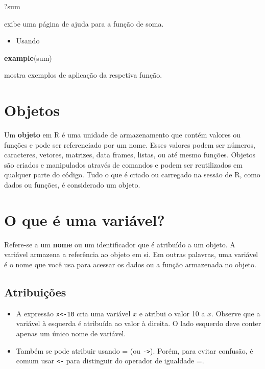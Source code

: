 \documentclass[
]{book}
\newenvironment{Shaded}{\begin{snugshade}}{\end{snugshade}}
\newcommand{\FunctionTok}[1]{\textcolor[rgb]{0.13,0.29,0.53}{\textbf{#1}}}
\newcommand{\NormalTok}[1]{#1}
\providecommand{\tightlist}{%
  \setlength{\itemsep}{0pt}\setlength{\parskip}{0pt}}
\begin{document}
\begin{Shaded}
\begin{Highlighting}[]
\NormalTok{?sum}
\end{Highlighting}
\end{Shaded}

exibe uma página de ajuda para a função de soma.

\begin{itemize}
\tightlist
\item
  Usando
\end{itemize}

\begin{Shaded}
\begin{Highlighting}[]
\FunctionTok{example}\NormalTok{(sum)}
\end{Highlighting}
\end{Shaded}

mostra exemplos de aplicação da respetiva função.

\section{Objetos}\label{objetos}

Um \textbf{objeto} em R é uma unidade de armazenamento que contém valores ou funções e pode ser referenciado por um nome. Esses valores podem ser números, caracteres, vetores, matrizes, data frames, listas, ou até mesmo funções. Objetos são criados e manipulados através de comandos e podem ser reutilizados em qualquer parte do código. Tudo o que é criado ou carregado na sessão de R, como dados ou funções, é considerado um objeto.

\section{O que é uma variável?}\label{o-que-uxe9-uma-variuxe1vel}

Refere-se a um \textbf{nome} ou um identificador que é atribuído a um objeto. A variável armazena a referência ao objeto em si. Em outras palavras, uma variável é o nome que você usa para acessar os dados ou a função armazenada no objeto.

\subsection{Atribuições}\label{atribuiuxe7uxf5es}

\begin{itemize}
\item
  A expressão \texttt{x\textless{}-10} cria uma variável \(x\) e atribui o valor 10 a \(x\). Observe que a variável à esquerda é atribuída ao valor à direita. O lado esquerdo deve conter apenas um único nome de variável.
\item
  Também se pode atribuir usando = (ou \texttt{-\textgreater{}}). Porém, para evitar confusão, é comum usar \texttt{\textless{}-} para distinguir do operador de igualdade =.
\end{itemize}
\end{document}
